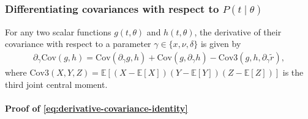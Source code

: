 \documentclass{article}
\begin{document}
\subsubsection{Differentiating covariances with respect to $P(t \mid \theta)$}\label{sec:derivative-covariance}

For any two scalar functions $g(t,\theta)$ and $h(t,\theta)$, the derivative of their covariance with respect to a parameter $\gamma \in \{x, \nu, \delta\}$ is given by
%
\begin{align}\label{eq:derivative-covariance-identity}
  \partial_{\gamma} \mathrm{Cov}(g, h) = \mathrm{Cov}(\partial_{\gamma} g, h) + \mathrm{Cov}(g, \partial_{\gamma} h) - \mathrm{Cov3}(g, h, \partial_{\gamma} \tilde{r}),
\end{align}
%
where $\mathrm{Cov3}(X,Y,Z) = \mathbb{E}[(X-\mathbb{E}[X])(Y-\mathbb{E}[Y])(Z-\mathbb{E}[Z])]$ is the third joint central moment.

\paragraph{Proof of \cref{eq:derivative-covariance-identity}}
\end{document}
